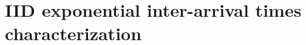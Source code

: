 \documentclass[letterpaper,10pt,english]{article}
\begin{document}


\section{IID exponential inter-arrival times characterization}
\end{document}
